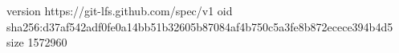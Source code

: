 version https://git-lfs.github.com/spec/v1
oid sha256:d37af542adf0fe0a14bb51b32605b87084af4b750c5a3fe8b872ecece394b4d5
size 1572960
